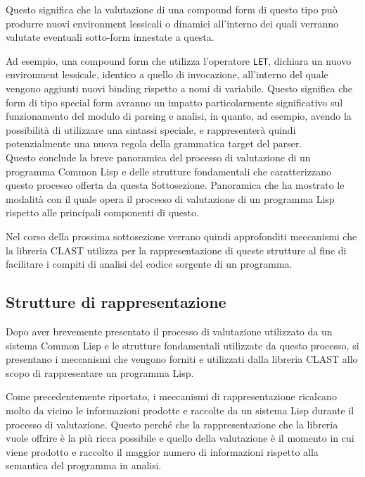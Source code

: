 Questo significa che la valutazione di una compound form di questo tipo può
produrre nuovi environment lessicali o dinamici all’interno dei quali verranno
valutate eventuali sotto-form innestate a questa.

Ad esempio, una compound form che utilizza l’operatore \texttt{LET}, dichiara un
nuovo environment lessicale, identico a quello di invocazione, all’interno del
quale vengono aggiunti nuovi binding rispetto a nomi di variabile. Questo
significa che form di tipo special form avranno un impatto particolarmente
significativo sul funzionamento del modulo di parsing e analisi, in quanto, ad
esempio, avendo la possibilità di utilizzare una sintassi speciale, e
rappresenterà quindi potenzialmente una nuova regola della grammatica target del
parser.\\

Questo conclude la breve panoramica del processo di valutazione di un programma
Common Lisp e delle strutture fondamentali che caratterizzano questo processo
offerta da questa Sottosezione. Panoramica che ha mostrato le modalità con il
quale opera il processo di valutazione di un programma Lisp rispetto alle
principali componenti di questo.

Nel corso della prossima sottosezione verrano quindi approfonditi meccanismi che
la libreria CLAST utilizza per la rappresentazione di queste strutture al fine
di facilitare i compiti di analisi del codice sorgente di un programma.

\subsection{Strutture di rappresentazione}

Dopo aver brevemente presentato il processo di valutazione utilizzato da un
sistema Common Lisp e le strutture fondamentali utilizzate da questo processo,
si presentano i meccanismi che vengono forniti e utilizzati dalla libreria CLAST
allo scopo di rappresentare un programma Lisp.

Come precedentemente riportato, i meccanismi di rappresentazione ricalcano
molto da vicino le informazioni prodotte e raccolte da un sistema Lisp durante
il processo di valutazione. Questo perché che la rappresentazione che la
libreria vuole offrire è la più ricca possibile e quello della valutazione è
il momento in cui viene prodotto e raccolto il maggior numero di informazioni
rispetto alla semantica del programma in analisi.\\

